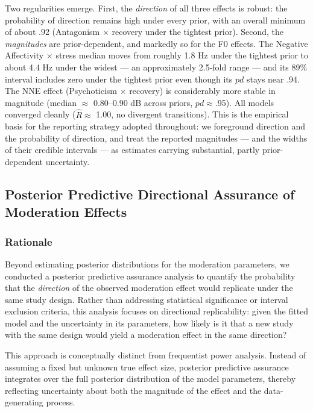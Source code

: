 \documentclass[
  english,
  man,floatsintext]{apa6}
\begin{document}
Two regularities emerge. First, the \emph{direction} of all three effects is robust: the
probability of direction remains high under every prior, with an overall minimum of about
.92 (Antagonism \(\times\) recovery under the tightest prior). Second, the \emph{magnitudes} are
prior-dependent, and markedly so for the F0 effects. The Negative Affectivity \(\times\)
stress median moves from roughly 1.8 Hz under the tightest prior to about 4.4 Hz under the
widest --- an approximately 2.5-fold range --- and its 89\% interval includes zero under the
tightest prior even though its \(pd\) stays near .94. The NNE effect (Psychoticism \(\times\)
recovery) is considerably more stable in magnitude (median \(\approx\) 0.80--0.90 dB across
priors, \(pd \approx\).95). All models converged cleanly (\(\hat{R} \approx\) 1.00, no
divergent transitions). This is the empirical basis for the reporting strategy adopted
throughout: we foreground direction and the probability of direction, and treat the
reported magnitudes --- and the widths of their credible intervals --- as estimates carrying
substantial, partly prior-dependent uncertainty.

\subsection{Posterior Predictive Directional Assurance of Moderation Effects}\label{s-assurance}

\subsubsection{Rationale}\label{rationale}

Beyond estimating posterior distributions for the moderation parameters, we conducted a posterior predictive assurance analysis to quantify the probability that the \emph{direction} of the observed moderation effect would replicate under the same study design. Rather than addressing statistical significance or interval exclusion criteria, this analysis focuses on directional replicability: given the fitted model and the uncertainty in its parameters, how likely is it that a new study with the same design would yield a moderation effect in the same direction?

This approach is conceptually distinct from frequentist power analysis. Instead of assuming a fixed but unknown true effect size, posterior predictive assurance integrates over the full posterior distribution of the model parameters, thereby reflecting uncertainty about both the magnitude of the effect and the data-generating process.
\end{document}
